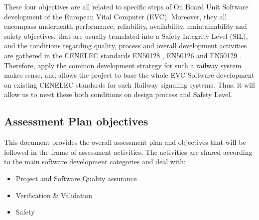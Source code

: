 \documentclass[openetcs]{template/openetcs_article}
\begin{document}
These four objectives are all related to specific steps of On Board Unit Software development of the European Vital Computer (EVC). Moreover, they all encompass
underneath performance, reliability, availability, maintainability and safety objectives, that are usually translated into a Safety Integrity Level (SIL), and
the conditions regarding quality, process and overall development activities are gathered in the CENELEC standards EN50128 \cite{EN50128}, EN50126
\cite{EN50126} and EN50129 \cite{EN50129}.
Therefore, apply the common development strategy for such a railway system makes sense, and allows the project to base the whole EVC Software development on
existing CENELEC standards for such Railway signaling systems. Thus, it will allow us to meet these both conditions on design process and Safety Level.

\subsection{Assessment Plan objectives}
This document provides the overall assessment plan and objectives that will be followed in the frame of assessment activities.
The activities are shared according to the main software development categories and deal with:
\begin{itemize}
\item Project and Software Quality assurance
\item Verification \& Validation
\item Safety
\end{itemize}
\end{document}
